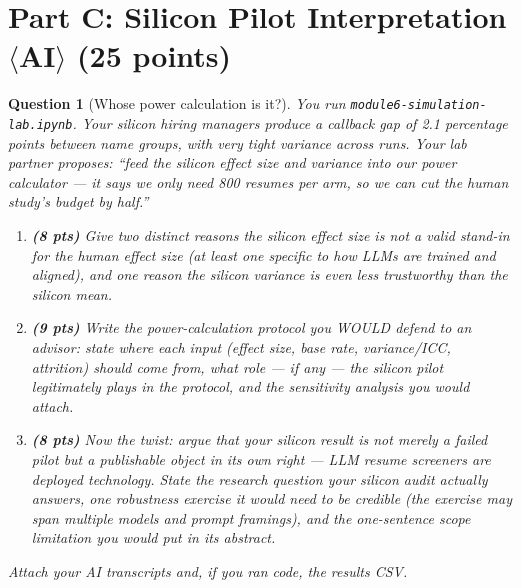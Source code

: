 \documentclass[11pt]{article}
\newtheorem{question}{Question}
\begin{document}
\section*{Part C: Silicon Pilot Interpretation $\langle$AI$\rangle$
(25 points)}

\begin{question}[Whose power calculation is it?]
You run \texttt{module6-simulation-lab.ipynb}. Your silicon hiring
managers produce a callback gap of 2.1 percentage points between name
groups, with very tight variance across runs. Your lab partner proposes:
``feed the silicon effect size and variance into our power calculator
--- it says we only need 800 resumes per arm, so we can cut the human
study's budget by half.''

\begin{enumerate}[label=(\alph*)]
  \item \textbf{(8 pts)} Give two distinct reasons the silicon effect
        size is not a valid stand-in for the human effect size (at
        least one specific to how LLMs are trained and aligned), and
        one reason the silicon \emph{variance} is even less trustworthy
        than the silicon mean.
  \item \textbf{(9 pts)} Write the power-calculation protocol you WOULD
        defend to an advisor: state where each input (effect size,
        base rate, variance/ICC, attrition) should come from, what role
        --- if any --- the silicon pilot legitimately plays in the
        protocol, and the sensitivity analysis you would attach.
  \item \textbf{(8 pts)} Now the twist: argue that your silicon result
        is not merely a failed pilot but a publishable object in its own
        right --- LLM resume screeners are deployed technology. State
        the research question your silicon audit actually answers, one
        robustness exercise it would need to be credible (the exercise
        may span multiple models and prompt framings), and the
        one-sentence scope limitation you would put in its abstract.
\end{enumerate}
Attach your AI transcripts and, if you ran code, the results CSV.
\end{question}
\end{document}
